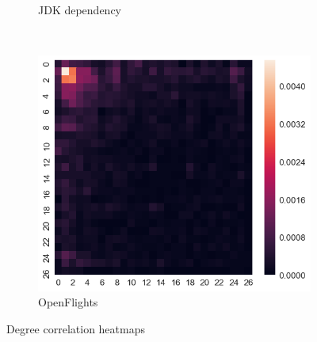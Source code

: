 \begin{figure}[h]
\begin{subfigure}[b]{0.3\textwidth}
        \caption*{JDK dependency}
    \end{subfigure}
    ~
    \begin{subfigure}[b]{0.3\textwidth}
        \includegraphics[width=\textwidth]{img/heatmap_2}
        \caption*{OpenFlights}
    \end{subfigure}
    \caption{Degree correlation heatmaps}
\end{figure}


